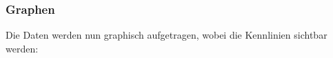 \subsubsection{Graphen}
Die Daten werden nun graphisch aufgetragen, wobei die Kennlinien sichtbar werden:
\begin{center}
\begin{minipage}{\linewidth}
\centering
{}
\end{minipage}
\begin{minipage}{\linewidth}
\centering
{}
\end{minipage}
\begin{minipage}{\linewidth}
\centering
{}
\end{minipage}
\end{center}
